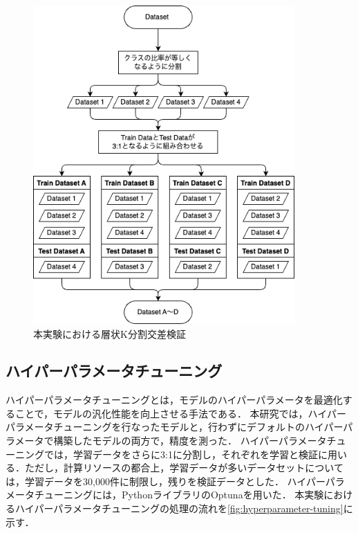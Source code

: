\begin{figure}
    \centering
    \includegraphics[width=10cm]{figures/stratified-k-fold.png}
    \caption{本実験における層状K分割交差検証}
    \label{fig:k-fold}
\end{figure}

\subsection{ハイパーパラメータチューニング}
ハイパーパラメータチューニングとは，モデルのハイパーパラメータを最適化することで，モデルの汎化性能を向上させる手法である．
本研究では，ハイパーパラメータチューニングを行なったモデルと，行わずにデフォルトのハイパーパラメータで構築したモデルの両方で，精度を測った．
ハイパーパラメータチューニングでは，学習データをさらに3:1に分割し，それぞれを学習と検証に用いる．ただし，計算リソースの都合上，学習データが多いデータセットについては，学習データを30,000件に制限し，残りを検証データとした．
ハイパーパラメータチューニングには，PythonライブラリのOptunaを用いた．
本実験におけるハイパーパラメータチューニングの処理の流れを\ref{fig:hyperparameter-tuning}に示す．


